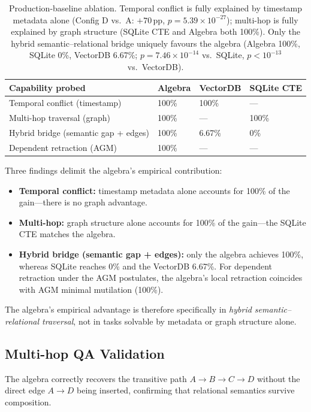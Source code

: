 \documentclass[11pt,a4paper]{article}
\theoremstyle{definition}
\begin{document}
\begin{table}[h]
\centering
\begin{tabular}{llll}
\toprule
\textbf{Capability probed} & \textbf{Algebra} & \textbf{VectorDB} & \textbf{SQLite CTE} \\
\midrule
Temporal conflict (timestamp) & 100\% & 100\% & --- \\
Multi-hop traversal (graph) & 100\% & --- & 100\% \\
Hybrid bridge (semantic gap + edges) & 100\% & 6.67\% & 0\% \\
Dependent retraction (AGM) & 100\% & --- & --- \\
\bottomrule
\end{tabular}
\caption{Production-baseline ablation. Temporal conflict is fully explained by timestamp metadata alone (Config D vs.\ A: $+70$\,pp, $p = 5.39\times10^{-27}$); multi-hop is fully explained by graph structure (SQLite CTE and Algebra both 100\%). Only the hybrid semantic--relational bridge uniquely favours the algebra (Algebra 100\%, SQLite 0\%, VectorDB 6.67\%; $p = 7.46\times10^{-14}$ vs.\ SQLite, $p < 10^{-13}$ vs.\ VectorDB).}
\label{tab:prod_baselines}
\end{table}

Three findings delimit the algebra's empirical contribution:
\begin{itemize}
    \item \textbf{Temporal conflict:} timestamp metadata alone accounts for 100\% of the gain---there is no graph advantage.
    \item \textbf{Multi-hop:} graph structure alone accounts for 100\% of the gain---the SQLite CTE matches the algebra.
    \item \textbf{Hybrid bridge (semantic gap + edges):} only the algebra achieves 100\%, whereas SQLite reaches 0\% and the VectorDB 6.67\%. For dependent retraction under the AGM postulates, the algebra's local retraction coincides with AGM minimal mutilation (100\%).
\end{itemize}
The algebra's empirical advantage is therefore specifically in \emph{hybrid semantic--relational traversal}, not in tasks solvable by metadata or graph structure alone.

\subsection{Multi-hop QA Validation}

The algebra correctly recovers the transitive path $A \to B \to C \to D$ without the direct edge $A \to D$ being inserted, confirming that relational semantics survive composition.
\end{document}
